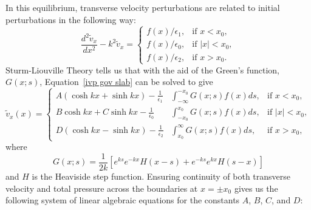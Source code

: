 \documentclass{aastex61}
\begin{document}
In this equilibrium, transverse velocity perturbations are related to initial perturbations in the following way:
\begin{equation}
\frac{d^2\tilde{v}_x}{dx^2} - k^2\tilde{v}_x = 
\begin{cases}
f(x)/\epsilon_1, & \text{if  } x<x_0,\\
f(x)/\epsilon_0, & \text{if  } |x|<x_0,\\
f(x)/\epsilon_2, & \text{if  } x>x_0.
\end{cases}
\label{ivp gov slab}
\end{equation}
Sturm-Liouville Theory tells us that with the aid of the Green's function, $G(x;s)$, Equation~\eqref{ivp gov slab} can be solved to give
\begin{equation}
\tilde{v}_x(x) = \left\{
\begin{aligned}
A(\cosh{kx} + \sinh{kx}) - \frac{1}{\epsilon_1} & \int_{-\infty}^{-x_0} G(x;s)f(x)ds, & \text{if  } x<x_0,\\
B\cosh{kx} + C\sinh{kx} - \frac{1}{\epsilon_0} & \int_{-x_0}^{x_0} G(x;s)f(x)ds, & \text{if  } |x|<x_0,\\
D(\cosh{kx} - \sinh{kx}) - \frac{1}{\epsilon_2} & \int_{x_0}^{\infty} G(x;s)f(x)ds, & \text{if  } x>x_0,
\end{aligned}
\right.
\label{ivp slab sol}
\end{equation}
where
\begin{equation}
G(x;s) = \frac{1}{2k}[e^{ks}e^{-kx}H(x-s) + e^{-ks}e^{kx}H(s-x)]
\end{equation}
and $H$ is the Heaviside step function. Ensuring continuity of both transverse velocity and total pressure across the boundaries at $x=\pm x_0$ gives us the following system of linear algebraic equations for the constants $A$, $B$, $C$, and $D$:
\end{document}
